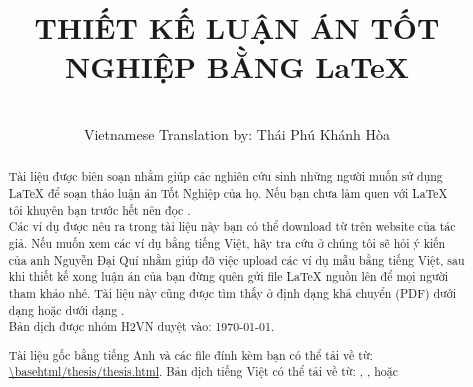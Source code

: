 \documentclass[a4paper]{report}
\begin{document}
\author{\Large\color{red}{Dr Nicola Talbot}\\[4.0ex]Vietnamese Translation by: Thái Phú Khánh Hòa\\[2.5ex] 
}
\title{THIẾT KẾ LUẬN ÁN TỐT NGHIỆP BẰNG \LaTeX{} }
\maketitle

\begin{abstract}
Tài liệu được biên soạn nhằm giúp các nghiên cứu sinh những người muốn sử dụng \LaTeX{} để soạn thảo luận án Tốt Nghiệp của họ.
Nếu bạn chưa  làm quen với \LaTeX{} tôi khuyên bạn trước hết nên đọc .\\[16.0ex]

Các ví dụ được nêu ra trong tài liệu này bạn có thể download từ  trên website của tác giả. Nếu muốn xem các ví dụ bằng tiếng Việt,  hãy tra cứu ở  chúng tôi sẽ hỏi ý kiến của anh Nguyễn Đại Quí nhằm giúp đỡ việc upload các ví dụ mẫu bằng tiếng Việt, sau khi thiết kế xong luận án của bạn đừng quên gửi file \LaTeX{} nguồn lên  để mọi người tham khảo nhé.
Tài liệu này cũng được tìm thấy ở định dạng khả chuyển (PDF) dưới dạng   hoặc dưới dạng .\\[2.0ex]
Bản dịch được nhóm H2VN duyệt  vào: \today.\\[2.0ex]


\begin{latexonly}
\noindent Tài liệu gốc bằng tiếng Anh và các file đính kèm bạn có thể tải về từ:
\url{\basehtml/thesis/thesis.html}. Bản dịch tiếng Việt có thể tải về từ: , ,  hoặc 

\end{latexonly}
\end{abstract}
\end{document}
